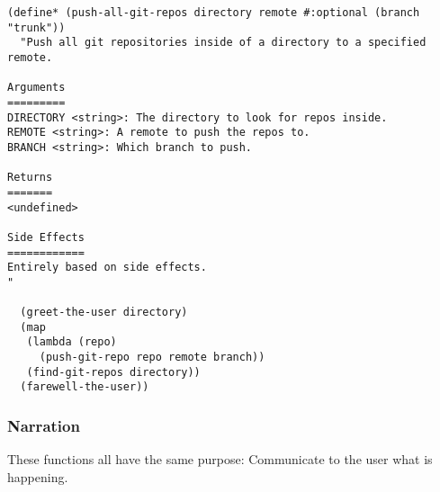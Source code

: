 \documentclass[11pt]{article}
\begin{document}
\begin{verbatim}
(define* (push-all-git-repos directory remote #:optional (branch "trunk"))
  "Push all git repositories inside of a directory to a specified remote.

Arguments
=========
DIRECTORY <string>: The directory to look for repos inside.
REMOTE <string>: A remote to push the repos to.
BRANCH <string>: Which branch to push.

Returns
=======
<undefined>

Side Effects
============
Entirely based on side effects.
"

  (greet-the-user directory)
  (map
   (lambda (repo)
     (push-git-repo repo remote branch))
   (find-git-repos directory))
  (farewell-the-user))

\end{verbatim}

\subsubsection{Narration}
\label{sec:org64a1a98}
These functions all have the same purpose: Communicate to the user what is
happening.
\end{document}
